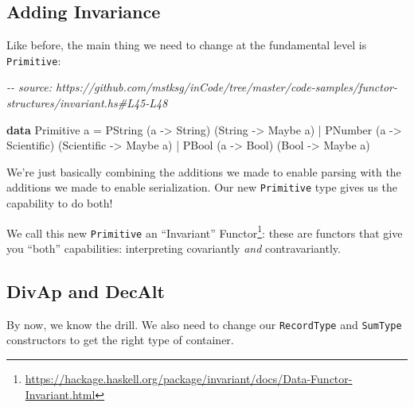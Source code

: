 \documentclass[]{article}
\newenvironment{Shaded}{}{}
\newcommand{\CommentTok}[1]{\textcolor[rgb]{0.38,0.63,0.69}{\textit{#1}}}
\newcommand{\DataTypeTok}[1]{\textcolor[rgb]{0.56,0.13,0.00}{#1}}
\newcommand{\KeywordTok}[1]{\textcolor[rgb]{0.00,0.44,0.13}{\textbf{#1}}}
\newcommand{\NormalTok}[1]{#1}
\newcommand{\OperatorTok}[1]{\textcolor[rgb]{0.40,0.40,0.40}{#1}}
\newcommand{\OtherTok}[1]{\textcolor[rgb]{0.00,0.44,0.13}{#1}}
\renewcommand{\href}[2]{#2\footnote{\url{#1}}}
\begin{document}
\hypertarget{adding-invariance}{%
\subsection{Adding Invariance}\label{adding-invariance}}

Like before, the main thing we need to change at the fundamental level is
\texttt{Primitive}:

\begin{Shaded}
\begin{Highlighting}[]
\CommentTok{{-}{-} source: https://github.com/mstksg/inCode/tree/master/code{-}samples/functor{-}structures/invariant.hs\#L45{-}L48}

\KeywordTok{data} \DataTypeTok{Primitive}\NormalTok{ a }\OtherTok{=}
      \DataTypeTok{PString}\NormalTok{ (a }\OtherTok{{-}>} \DataTypeTok{String}\NormalTok{)     (}\DataTypeTok{String}     \OtherTok{{-}>} \DataTypeTok{Maybe}\NormalTok{ a)}
    \OperatorTok{|} \DataTypeTok{PNumber}\NormalTok{ (a }\OtherTok{{-}>} \DataTypeTok{Scientific}\NormalTok{) (}\DataTypeTok{Scientific} \OtherTok{{-}>} \DataTypeTok{Maybe}\NormalTok{ a)}
    \OperatorTok{|} \DataTypeTok{PBool}\NormalTok{   (a }\OtherTok{{-}>} \DataTypeTok{Bool}\NormalTok{)       (}\DataTypeTok{Bool}       \OtherTok{{-}>} \DataTypeTok{Maybe}\NormalTok{ a)}
\end{Highlighting}
\end{Shaded}

We're just basically combining the additions we made to enable parsing with the
additions we made to enable serialization. Our new \texttt{Primitive} type gives
us the capability to do both!

We call this new \texttt{Primitive} an
\href{https://hackage.haskell.org/package/invariant/docs/Data-Functor-Invariant.html}{``Invariant''
Functor}: these are functors that give you ``both'' capabilities: interpreting
covariantly \emph{and} contravariantly.

\hypertarget{divap-and-decalt}{%
\subsection{DivAp and DecAlt}\label{divap-and-decalt}}

By now, we know the drill. We also need to change our \texttt{RecordType} and
\texttt{SumType} constructors to get the right type of container.
\end{document}
